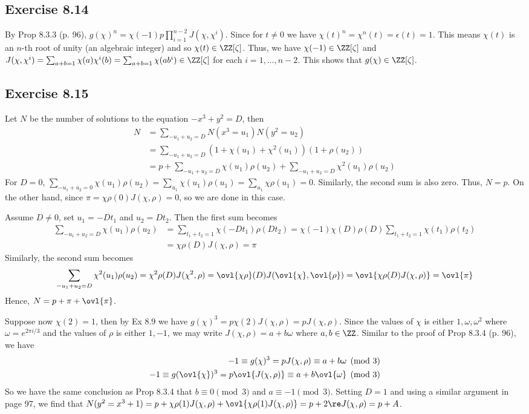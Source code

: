 \documentclass[../Chapter.tex]{subfiles}
\begin{document}
\subsection*{Exercise 8.14}

By Prop 8.3.3 (p. 96), $g(\chi)^n=\chi(-1)p\prod_{i=1}^{n-2} J(\chi,\chi^i)$. Since for $t\neq0$ we have $\chi(t)^n=\chi^n(t)=\epsilon(t)=1$. This means $\chi(t)$ is an $n$-th root of unity (an algebraic integer) and so $\chi(t)\in\ZZ[\zeta]$. Thus, we have $\chi(-1)\in\ZZ[\zeta]$ and $J(\chi,\chi^i)=\sum_{a+b=1} \chi(a)\chi^i(b)=\sum_{a+b=1} \chi(ab^i)\in\ZZ[\zeta]$ for each $i=1,\ldots,n-2$. This shows that $g(\chi)\in\ZZ[\zeta]$.

\subsection*{Exercise 8.15}

Let $N$ be the number of solutions to the equation $-x^3+y^2=D$, then 
\begin{align*}
N &= \sum_{-u_1+u_2=D} N(x^3=u_1)N(y^2=u_2) \\
&= \sum_{-u_1+u_2=D} (1+\chi(u_1)+\chi^2(u_1))(1+\rho(u_2)) \\
&= p + \sum_{-u_1+u_2=D} \chi(u_1)\rho(u_2) + \sum_{-u_1+u_2=D} \chi^2(u_1)\rho(u_2)
\end{align*}
For $D=0$, $\sum_{-u_1+u_2=0} \chi(u_1)\rho(u_2) = \sum_{u_1} \chi(u_1)\rho(u_1) = \sum_{u_1} \chi\rho(u_1) = 0$. Similarly, the second sum is also zero. Thus, $N=p$. On the other hand, since $\pi=\chi\rho(0)J(\chi,\rho)=0$, so we are done in this case.

Assume $D\neq0$, set $u_1=-Dt_1$ and $u_2=Dt_2$. Then the first sum becomes
\begin{align*}
\sum_{-u_1+u_2=D} \chi(u_1)\rho(u_2) &= \sum_{t_1+t_2=1} \chi(-Dt_1)\rho(Dt_2) = \chi(-1)\chi(D)\rho(D)\sum_{t_1+t_2=1} \chi(t_1)\rho(t_2) \\
&= \chi\rho(D)J(\chi,\rho) = \pi
\end{align*}
Similarly, the second sum becomes
\begin{align*}
\sum_{-u_1+u_2=D} \chi^2(u_1)\rho(u_2) = \chi^2\rho(D)J(\chi^2,\rho) = \ovl{\chi\rho}(D)J(\ovl{\chi},\ovl{\rho}) = \ovl{\chi\rho(D)J(\chi,\rho)} = \ovl{\pi}
\end{align*}
Hence, $N=p+\pi+\ovl{\pi}$.

Suppose now $\chi(2)=1$, then by Ex 8.9 we have $g(\chi)^3=p\chi(2)J(\chi,\rho)=pJ(\chi,\rho)$. Since the values of $\chi$ is either $1,\omega,\omega^2$ where $\omega=e^{2\pi i/3}$ and the values of $\rho$ is either $1,-1$, we may write $J(\chi,\rho)=a+b\omega$ where $a,b\in\ZZ$. Similar to the proof of Prop 8.3.4 (p. 96), we have
\begin{align*}
-1\equiv g(\chi)^3 = pJ(\chi,\rho) \equiv a+b\omega \pmod{3} \\
-1\equiv g(\ovl{\chi})^3 = p\ovl{J(\chi,\rho)} \equiv a+b\ovl{\omega} \pmod{3}
\end{align*}
So we have the same conclusion as Prop 8.3.4 that $b\equiv0\pmod{3}$ and $a\equiv-1\pmod{3}$. Setting $D=1$ and using a similar argument in page 97, we find that $N(y^2=x^3+1)=p+\chi\rho(1)J(\chi,\rho)+\ovl{\chi\rho(1)J(\chi,\rho)}=p+2\re J(\chi,\rho)=p+A$.
\end{document}

